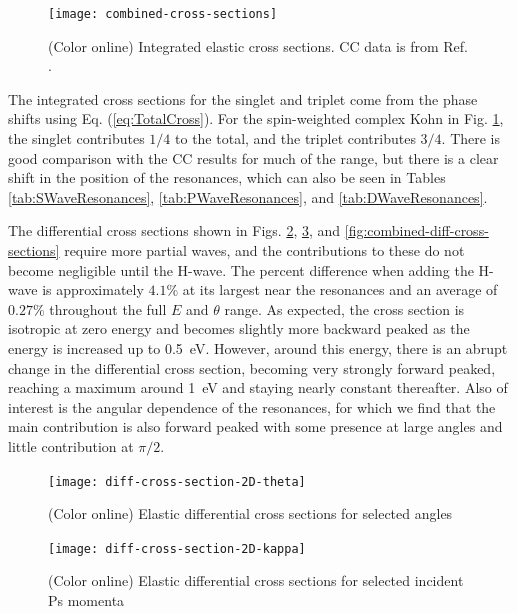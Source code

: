 \documentclass[reprint,showpacs,preprintnumbers,amsmath,amssymb,pra,aps]{revtex4-1}
\begin{document}
\begin{figure}[H]
	\centering
	\texttt{[image: combined-cross-sections]}
	\caption{(Color online) Integrated elastic cross sections. CC data is from Ref. \cite{Walters2004}.}
	\label{fig:combined-cross-sections}
\end{figure}

The integrated cross sections for the singlet and triplet come from the phase shifts using Eq. (\ref{eq:TotalCross}). For the spin-weighted complex Kohn in Fig. \ref{fig:combined-cross-sections}, the singlet contributes $1/4$ to the total, and the triplet contributes $3/4$. There is good comparison with the CC results \cite{Walters2004} for much of the range, but there is a clear shift in the position of the resonances, which can also be seen in Tables \ref{tab:SWaveResonances}, \ref{tab:PWaveResonances}, and \ref{tab:DWaveResonances}.

The differential cross sections shown in Figs. \ref{fig:diff-cross-section-2D-theta}, \ref{fig:diff-cross-section-2D-kappa}, and \ref{fig:combined-diff-cross-sections} require more partial waves, and the contributions to these do not become negligible until the H-wave. The percent difference when adding the H-wave is approximately $4.1\%$ at its largest near the resonances and an average of $0.27\%$ throughout the full $E$ and $\theta$ range. As expected, the cross section is isotropic at zero energy and becomes slightly more backward peaked as the energy is increased up to \mbox{0.5 eV}. However, around this energy, there is an abrupt change in the differential cross section, becoming very strongly forward peaked, reaching a maximum around \mbox{1 eV} and staying nearly constant thereafter. Also of interest is the angular dependence of the resonances, for which we find that the main contribution is also forward peaked with some presence at large angles and little contribution at $\pi/2$.

\begin{figure}[H]
	\centering
	\texttt{[image: diff-cross-section-2D-theta]}
	\caption{(Color online) Elastic differential cross sections for selected angles}
	\label{fig:diff-cross-section-2D-theta}
\end{figure}

\begin{figure}[H]
	\centering
	\texttt{[image: diff-cross-section-2D-kappa]}
	\caption{(Color online) Elastic differential cross sections for selected incident Ps momenta}
	\label{fig:diff-cross-section-2D-kappa}
\end{figure}
\end{document}
